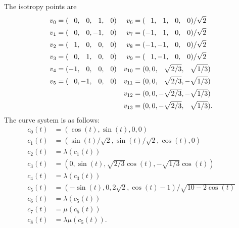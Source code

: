 \documentclass[reqno]{amsart}
\newcommand{\lm}        {\lambda}
\newcommand{\rt}        {\sqrt{2}}
\newcommand{\pp}        {\hphantom{+}}
\renewcommand{\:}{\colon}
\theoremstyle{definition}
\begin{document}
The isotropy points are
\begin{align*}
 v_{ 0} &= (\pp 0,\pp 0,\pp 1,\pp 0) &
 v_{ 6} &= (\pp 1,\pp 1,\pp 0,\pp 0)/\rt \\
 v_{ 1} &= (\pp 0,\pp 0,   -1,\pp 0) &
 v_{ 7} &= (   -1,\pp 1,\pp 0,\pp 0)/\rt \\
 v_{ 2} &= (\pp 1,\pp 0,\pp 0,\pp 0) &
 v_{ 8} &= (   -1,   -1,\pp 0,\pp 0)/\rt \\
 v_{ 3} &= (\pp 0,\pp 1,\pp 0,\pp 0) &
 v_{ 9} &= (\pp 1,   -1,\pp 0,\pp 0)/\rt \\
 v_{ 4} &= (   -1,\pp 0,\pp 0,\pp 0) &
 v_{10} &= (0,0,\pp\sqrt{2/3},\pp\sqrt{1/3}) \\
 v_{ 5} &= (\pp 0,-1,\pp 0,\pp 0) &
 v_{11} &= (0,0,\pp\sqrt{2/3},  -\sqrt{1/3}) \\
 &&
 v_{12} &= (0,0,  -\sqrt{2/3},  -\sqrt{1/3}) \\
 &&
 v_{13} &= (0,0,  -\sqrt{2/3},\pp\sqrt{1/3}).
\end{align*}
The curve system is as follows:
\begin{align*}
 c_0(t) &= \left(\cos(t),\sin(t),0,0\right) \\
 c_1(t) &= \left(\sin(t)/\rt,\sin(t)/\rt,\cos(t),0\right) \\
 c_2(t) &= \lm(c_1(t)) \\
 c_3(t) &= \left(0,\sin(t),\sqrt{2/3}\cos(t),-\sqrt{1/3}\cos(t)\right) \\
 c_4(t) &= \lm(c_3(t)) \\
 c_5(t) &= \left(-\sin(t),0,2\rt,\cos(t)-1\right)/\sqrt{10-2\cos(t)} \\
 c_6(t) &= \lm(c_5(t)) \\
 c_7(t) &= \mu(c_5(t)) \\
 c_8(t) &= \lm\mu(c_5(t)).
\end{align*}
\end{document}
